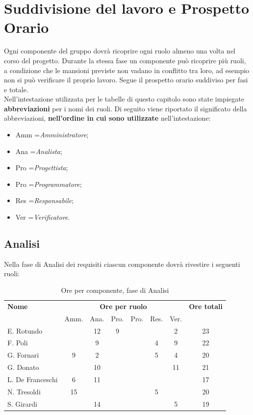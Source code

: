 \section{Suddivisione del lavoro e Prospetto Orario} 


Ogni componente del gruppo dovrà ricoprire ogni ruolo almeno una volta nel corso del progetto.
Durante la stessa fase un componente può ricoprire più ruoli, a condizione che le mansioni previste non vadano in conflitto tra loro, ad esempio non si può verificare il proprio lavoro.
Segue il prospetto orario suddiviso per fasi e totale. \\

Nell'intestazione utilizzata per le tabelle di questo capitolo sono state impiegate \textbf{abbreviazioni} per i nomi dei ruoli.
Di seguito viene riportato il significato della abbreviazioni, \textbf{nell'ordine in cui sono utilizzate} nell'intestazione:
\begin{itemize}
\item Amm =\textit{Amministratore};
\item Ana =\textit{Analista};
\item Pro =\textit{Progettista};
\item Pro =\textit{Programmatore};
\item Res =\textit{Responsabile};
\item Ver =\textit{Verificatore}.
\end{itemize}
\subsection{Analisi}

Nella fase di Analisi dei requisiti ciascun componente dovrà rivestire i seguenti ruoli:
\noindent
\begin{table}[H]
\begin{tabular}{lccccccc}
\toprule
    \textbf{Nome}  & \multicolumn{6}{c}{\textbf{Ore per ruolo}} & \textbf{Ore totali} \\
     & Amm. & Ana. & Pro. & Pro. & Res. & Ver. \\
    \midrule
    E. Rotundo 		&   & 12 & 9 &  &  & 2 & 23 \\
    F. Poli 		&   & 9 &  &  & 4 & 9 & 22 \\
    G. Fornari		& 9 & 2 & 	&  & 5 & 4 & 20 \\
    G. Donato 		&   & 10 &  &  &  & 11 & 21 \\
    L. De Franceschi  & 6 & 11 &  &  &  &  & 17 \\
    N. Tresoldi 		& 15&  &  &  & 5 &  & 20 \\
   	S. Girardi 		&   & 14 &  &  &  & 5 & 19 \\
    
    \bottomrule
\end{tabular}
\caption{Ore per componente, fase di Analisi}
\end{table}


